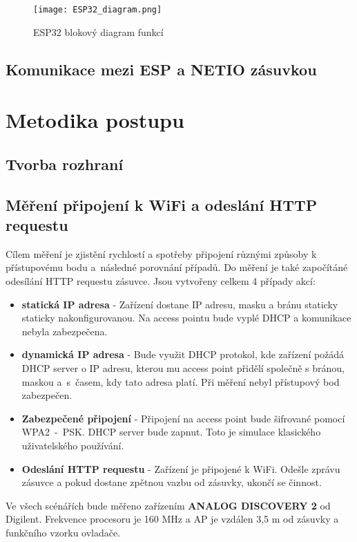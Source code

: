 \documentclass[a4paper, 12pt]{report}
\begin{document}
				\begin{figure}[h]
					\centering
					\texttt{[image: ESP32\_diagram.png]}
					\caption{ESP32 blokový diagram funkcí}
					\label{ESP32_diagram}
				\end{figure}



		\section{Komunikace mezi ESP a NETIO zásuvkou}

	\chapter{Metodika postupu}
		\section{Tvorba rozhraní}
		\section{Měření připojení k WiFi a odeslání HTTP requestu} \label{metodika:wifi}
				Cílem měření je zjistění rychlostí a spotřeby připojení různými způsoby k přístupovému bodu a~následné porovnání případů. Do měření je také započítáné odesílání HTTP requestu zásuvce. Jsou vytvořeny celkem 4 případy akcí:
				\begin{itemize}
					\item {\bf statická IP adresa} - 	Zařízení dostane IP adresu, masku a bránu staticky staticky nakonfigurovanou. Na access pointu bude vyplé DHCP a komunikace nebyla zabezpečena.
					\item {\bf dynamická IP adresa} - Bude využit DHCP protokol, kde zařízení požádá DHCP server o IP adresu, kterou mu access point přidělí společně s bránou, maskou a~s~časem, kdy tato adresa platí. Při měření nebyl přístupový bod zabezpečen.
					\item {\bf Zabezpečené připojení} - Připojení na access point bude šifrované pomocí WPA2~-~PSK. DHCP server bude zapnut. Toto je simulace klasického uživatelského používání.
					\item {\bf Odeslání HTTP requestu} - Zařízení je připojené k WiFi. Odešle zprávu zásuvce a pokud dostane zpětnou vazbu od zásuvky, ukončí se činnost.
				\end{itemize}
				Ve všech scénářích bude měřeno zařízením {\bf ANALOG DISCOVERY 2} od Digilent. Frekvence procesoru je 160 \si{MHz} a AP je vzdálen 3,5 \si{m} od zásuvky a funkčního vzorku ovladače.
\end{document}
